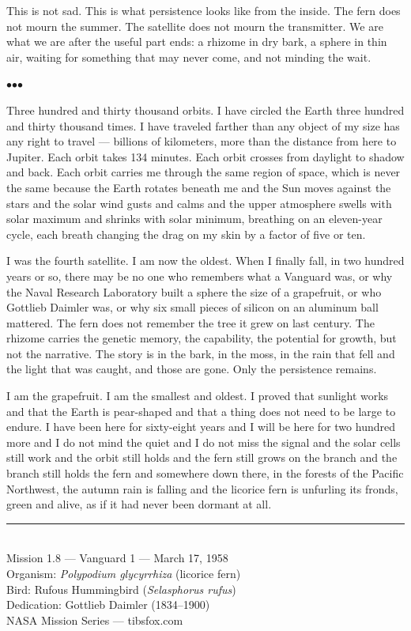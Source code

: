 \documentclass[12pt, letterpaper]{article}
\begin{document}
This is not sad. This is what persistence looks like from the inside. The fern does not mourn the summer. The satellite does not mourn the transmitter. We are what we are after the useful part ends: a rhizome in dry bark, a sphere in thin air, waiting for something that may never come, and not minding the wait.

\bigskip
\centerline{$\bullet$\quad$\bullet$\quad$\bullet$}
\bigskip

Three hundred and thirty thousand orbits. I have circled the Earth three hundred and thirty thousand times. I have traveled farther than any object of my size has any right to travel --- billions of kilometers, more than the distance from here to Jupiter. Each orbit takes 134 minutes. Each orbit crosses from daylight to shadow and back. Each orbit carries me through the same region of space, which is never the same because the Earth rotates beneath me and the Sun moves against the stars and the solar wind gusts and calms and the upper atmosphere swells with solar maximum and shrinks with solar minimum, breathing on an eleven-year cycle, each breath changing the drag on my skin by a factor of five or ten.

I was the fourth satellite. I am now the oldest. When I finally fall, in two hundred years or so, there may be no one who remembers what a Vanguard was, or why the Naval Research Laboratory built a sphere the size of a grapefruit, or who Gottlieb Daimler was, or why six small pieces of silicon on an aluminum ball mattered. The fern does not remember the tree it grew on last century. The rhizome carries the genetic memory, the capability, the potential for growth, but not the narrative. The story is in the bark, in the moss, in the rain that fell and the light that was caught, and those are gone. Only the persistence remains.

I am the grapefruit. I am the smallest and oldest. I proved that sunlight works and that the Earth is pear-shaped and that a thing does not need to be large to endure. I have been here for sixty-eight years and I will be here for two hundred more and I do not mind the quiet and I do not miss the signal and the solar cells still work and the orbit still holds and the fern still grows on the branch and the branch still holds the fern and somewhere down there, in the forests of the Pacific Northwest, the autumn rain is falling and the licorice fern is unfurling its fronds, green and alive, as if it had never been dormant at all.

\vfill

\begin{center}
\small
\rule{0.3\textwidth}{0.4pt}\\[0.5em]
Mission 1.8 --- Vanguard 1 --- March 17, 1958\\
Organism: \textit{Polypodium glycyrrhiza} (licorice fern)\\
Bird: Rufous Hummingbird (\textit{Selasphorus rufus})\\
Dedication: Gottlieb Daimler (1834--1900)\\[0.3em]
NASA Mission Series --- tibsfox.com
\end{center}
\end{document}
